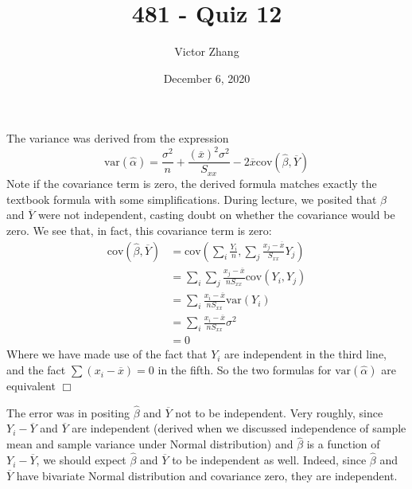 \documentclass{article}
\title{481 - Quiz 12}
\author{Victor Zhang}
\date{December 6, 2020}
\begin{document}
\maketitle
\noindent
The variance was derived from the expression
$$\mathrm{var}(\hat{\alpha}) = \frac{\sigma^2}{n} + \frac{(\overline{x})^2\sigma^2}{S_{xx}} - 2\overline{x}\mathrm{cov}(\hat{\beta},\overline{Y})$$
Note if the covariance term is zero, the derived formula matches exactly the textbook formula with some simplifications. During lecture, we posited that $\hat{\beta}$ and $\overline{Y}$ were not independent, casting doubt on whether the covariance would be zero. We see that, in fact, this covariance term is zero:\\
\begin{equation*}
    \begin{split}
        \mathrm{cov}(\hat{\beta},\overline{Y}) &= \mathrm{cov}\left(\sum\limits_i \frac{Y_i}{n}, \sum\limits_j \frac{x_j - \overline{x}}{S_{xx}}Y_j\right)\\
        &= \sum\limits_i\sum\limits_j \frac{x_j - \overline{x}}{nS_{xx}} \mathrm{cov}(Y_i,Y_j)\\
        &= \sum\limits_i \frac{x_i - \overline{x}}{nS_{xx}} \mathrm{var}(Y_i)\\
        &= \sum\limits_i \frac{x_i - \overline{x}}{nS_{xx}}\sigma^2\\
        &= 0
    \end{split}
\end{equation*}
Where we have made use of the fact that $Y_i$ are independent in the third line, and the fact $\sum (x_i-\overline{x}) = 0$ in the fifth. So the two formulas for $\mathrm{var}(\hat{\alpha})$ are equivalent $\Box$

The error was in positing $\hat{\beta}$ and $\overline{Y}$ not to be independent. Very roughly, since $Y_i-\overline{Y}$ and $\overline{Y}$ are independent (derived when we discussed independence of sample mean and sample variance under Normal distribution) and $\hat{\beta}$ is a function of $Y_i-\overline{Y}$, we should expect $\hat{\beta}$ and $\overline{Y}$ to be independent as well. Indeed, since $\hat{\beta}$ and $\overline{Y}$ have bivariate Normal distribution and covariance zero, they are independent.
\end{document}
